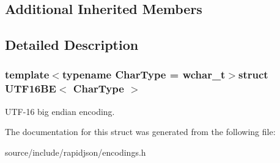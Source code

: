 \subsection*{Additional Inherited Members}


\subsection{Detailed Description}
\subsubsection*{template$<$typename Char\+Type = wchar\+\_\+t$>$struct U\+T\+F16\+B\+E$<$ Char\+Type $>$}

U\+T\+F-\/16 big endian encoding. 

The documentation for this struct was generated from the following file\+:\begin{DoxyCompactItemize}
\item 
source/include/rapidjson/encodings.\+h\end{DoxyCompactItemize}
